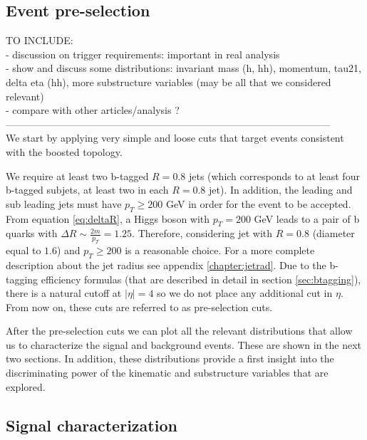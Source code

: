
\subsection{Event pre-selection}

TO INCLUDE: \\
- discussion on trigger requirements: important in real analysis\\
- show and discuss some distributions: invariant mass (h, hh), momentum, tau21, delta eta (hh), more substructure variables (may be all that we considered relevant)\\
- compare with other articles/analysis ? \\

--------------------------------------------------------------------------------------------------\\
We start by applying very simple and loose cuts that target events consistent with the boosted topology. 

We require at least two b-tagged $R=0.8$ jets (which corresponds to at least four b-tagged subjets, at least two in each $R=0.8$ jet). In addition, the leading and sub leading jets must have $p_T\geq200$ GeV in order for the event to be accepted. From equation \ref{eq:deltaR}, a Higgs boson with $p_T=200$ GeV leads to a pair of b quarks with $\Delta R\sim \frac{2m}{p_T}=1.25$. Therefore, considering jet with $R=0.8$ (diameter equal to $1.6$) and $p_T\geq 200$ is a reasonable choice. For a more complete description about the jet radius see appendix \ref{chapter:jetrad}. Due to the b-tagging efficiency formulas (that are described in detail in section \ref{sec:btagging}), there is a natural cutoff at $|\eta|=4$ so we do not place any additional cut in $\eta$. From now on, these cuts are referred to as pre-selection cuts.

After the pre-selection cuts we can plot all the relevant distributions that allow us to characterize the signal and background events. These are shown in the next two sections. In addition, these distributions provide a first insight into the discriminating power of the kinematic and substructure variables that are explored.  

\subsection{Signal characterization}

